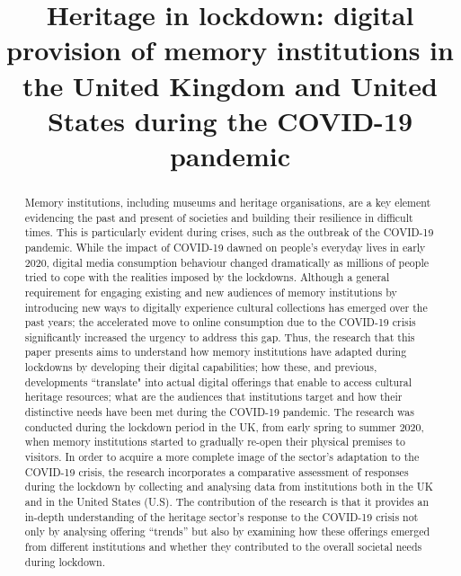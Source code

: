 \documentclass{egpubl}
\title[Heritage in lockdown: digital provision of memory institutions during the COVID-19 pandemic]%
      {Heritage in lockdown: digital provision of memory institutions in the United Kingdom and United States during the COVID-19 pandemic}
\begin{document}

\maketitle
\begin{abstract}
Memory institutions, including museums and heritage organisations, are a key element evidencing the past and present of societies and building their resilience in difficult times. This is particularly evident during crises, such as the outbreak of the COVID-19 pandemic. While the impact of COVID-19 dawned on people's everyday lives in early 2020, digital media consumption behaviour changed dramatically as millions of people tried to cope with the realities imposed by the lockdowns. Although a general requirement for engaging existing and new audiences of memory institutions by introducing new ways to digitally experience cultural collections has emerged over the past years; the accelerated move to online consumption due to the COVID-19 crisis significantly increased the urgency to address this gap. Thus, the research that this paper presents aims to understand how memory institutions have adapted during lockdowns by developing their digital capabilities; how these, and previous, developments ``translate" into actual digital offerings that enable to access cultural heritage resources; what are the audiences that institutions target and how their distinctive needs have been met during the COVID-19 pandemic. The research  was conducted during the lockdown period in the UK, from early spring to summer 2020, when memory institutions started to gradually re-open their physical premises to visitors. In order to acquire a more complete image of the sector's adaptation to the COVID-19 crisis, the research incorporates a comparative assessment of responses during the lockdown by collecting and analysing data from institutions both in the UK and in the United States (U.S). The contribution of the research is that it provides an in-depth understanding of the heritage sector's response to the COVID-19 crisis not only by analysing offering ``trends'' but also by examining how these offerings emerged from different institutions and whether they contributed to the overall societal needs during lockdown. 


\end{abstract}
\end{document}
